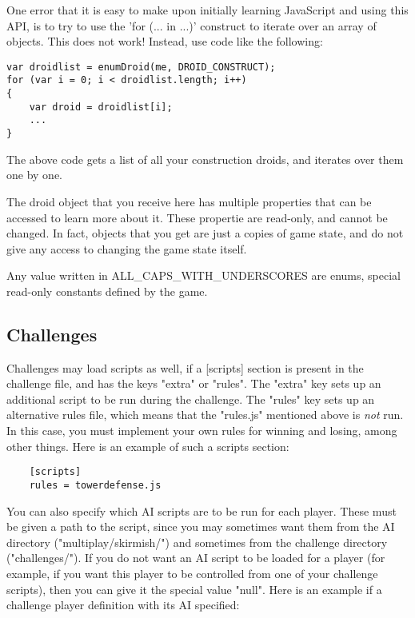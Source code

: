 \documentclass[12pt]{article}
\begin{document}
One error that it is easy to make upon initially learning JavaScript and using this API, is to try to use
the 'for (... in ...)' construct to iterate over an array of objects. This does not work! Instead, use code
like the following:

\begin{lstlisting}
var droidlist = enumDroid(me, DROID_CONSTRUCT);
for (var i = 0; i < droidlist.length; i++)
{
	var droid = droidlist[i];
	...
}
\end{lstlisting}

The above code gets a list of all your construction droids, and iterates over them one by one.

The droid object that you receive here has multiple properties that can be accessed to learn more about it. 
These propertie are read-only, and cannot be changed. In fact, objects that you get are just a copies of 
game state, and do not give any access to changing the game state itself.

Any value written in ALL_CAPS_WITH_UNDERSCORES are enums, special read-only constants defined by the
game.

\subsection{Challenges}

Challenges may load scripts as well, if a [scripts] section is present in the challenge file, and has the keys 
"extra" or "rules". The "extra" key sets up an additional script to be run during the challenge. The "rules"
key sets up an alternative rules file, which means that the "rules.js" mentioned above is \emph{not} run. In
this case, you must implement your own rules for winning and losing, among other things. Here is an example
of such a scripts section:

\begin{lstlisting}
	[scripts]
	rules = towerdefense.js
\end{lstlisting}

You can also specify which AI scripts are to be run for each player. These must be given a path to the script,
since you may sometimes want them from the AI directory ("multiplay/skirmish/") and sometimes from the challenge
directory ("challenges/"). If you do not want an AI script to be loaded for a player (for example, if you want 
this player to be controlled from one of your challenge scripts), then you can give it the special value "null". 
Here is an example if a challenge player definition with its AI specified:
\end{document}
